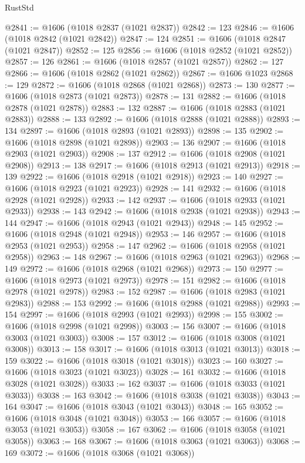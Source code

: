 \begin{lexlean}{RustStd}
\begin{coremodule}
{\begin{coremodule}
{{{{{{{{{{{{{{{{{{{{{{{{{{{{{{{{{{{{{{{{{{{{{{{{{{{{{{{{{{{{{{{{{{{{@2841 := @1606 (@1018 @2837 (@1021 @2837))
@2842 := 123
@2846 := @1606 (@1018 @2842 (@1021 @2842))
@2847 := 124
@2851 := @1606 (@1018 @2847 (@1021 @2847))
@2852 := 125
@2856 := @1606 (@1018 @2852 (@1021 @2852))
@2857 := 126
@2861 := @1606 (@1018 @2857 (@1021 @2857))
@2862 := 127
@2866 := @1606 (@1018 @2862 (@1021 @2862))
@2867 := @1606 @1023
@2868 := 129
@2872 := @1606 (@1018 @2868 (@1021 @2868))
@2873 := 130
@2877 := @1606 (@1018 @2873 (@1021 @2873))
@2878 := 131
@2882 := @1606 (@1018 @2878 (@1021 @2878))
@2883 := 132
@2887 := @1606 (@1018 @2883 (@1021 @2883))
@2888 := 133
@2892 := @1606 (@1018 @2888 (@1021 @2888))
@2893 := 134
@2897 := @1606 (@1018 @2893 (@1021 @2893))
@2898 := 135
@2902 := @1606 (@1018 @2898 (@1021 @2898))
@2903 := 136
@2907 := @1606 (@1018 @2903 (@1021 @2903))
@2908 := 137
@2912 := @1606 (@1018 @2908 (@1021 @2908))
@2913 := 138
@2917 := @1606 (@1018 @2913 (@1021 @2913))
@2918 := 139
@2922 := @1606 (@1018 @2918 (@1021 @2918))
@2923 := 140
@2927 := @1606 (@1018 @2923 (@1021 @2923))
@2928 := 141
@2932 := @1606 (@1018 @2928 (@1021 @2928))
@2933 := 142
@2937 := @1606 (@1018 @2933 (@1021 @2933))
@2938 := 143
@2942 := @1606 (@1018 @2938 (@1021 @2938))
@2943 := 144
@2947 := @1606 (@1018 @2943 (@1021 @2943))
@2948 := 145
@2952 := @1606 (@1018 @2948 (@1021 @2948))
@2953 := 146
@2957 := @1606 (@1018 @2953 (@1021 @2953))
@2958 := 147
@2962 := @1606 (@1018 @2958 (@1021 @2958))
@2963 := 148
@2967 := @1606 (@1018 @2963 (@1021 @2963))
@2968 := 149
@2972 := @1606 (@1018 @2968 (@1021 @2968))
@2973 := 150
@2977 := @1606 (@1018 @2973 (@1021 @2973))
@2978 := 151
@2982 := @1606 (@1018 @2978 (@1021 @2978))
@2983 := 152
@2987 := @1606 (@1018 @2983 (@1021 @2983))
@2988 := 153
@2992 := @1606 (@1018 @2988 (@1021 @2988))
@2993 := 154
@2997 := @1606 (@1018 @2993 (@1021 @2993))
@2998 := 155
@3002 := @1606 (@1018 @2998 (@1021 @2998))
@3003 := 156
@3007 := @1606 (@1018 @3003 (@1021 @3003))
@3008 := 157
@3012 := @1606 (@1018 @3008 (@1021 @3008))
@3013 := 158
@3017 := @1606 (@1018 @3013 (@1021 @3013))
@3018 := 159
@3022 := @1606 (@1018 @3018 (@1021 @3018))
@3023 := 160
@3027 := @1606 (@1018 @3023 (@1021 @3023))
@3028 := 161
@3032 := @1606 (@1018 @3028 (@1021 @3028))
@3033 := 162
@3037 := @1606 (@1018 @3033 (@1021 @3033))
@3038 := 163
@3042 := @1606 (@1018 @3038 (@1021 @3038))
@3043 := 164
@3047 := @1606 (@1018 @3043 (@1021 @3043))
@3048 := 165
@3052 := @1606 (@1018 @3048 (@1021 @3048))
@3053 := 166
@3057 := @1606 (@1018 @3053 (@1021 @3053))
@3058 := 167
@3062 := @1606 (@1018 @3058 (@1021 @3058))
@3063 := 168
@3067 := @1606 (@1018 @3063 (@1021 @3063))
@3068 := 169
@3072 := @1606 (@1018 @3068 (@1021 @3068))
}}}}}}}}}}}}}}}}}}}}}}}}}}}}}}}}}}}}}}}}}}}}}}}}}}}}}}}}}}}}}}}}}}}}
\end{coremodule}}
\end{coremodule}
\end{lexlean}
